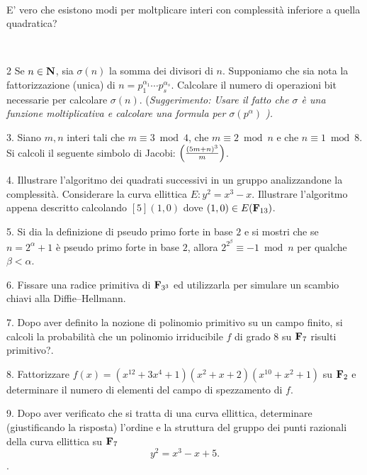 \ \dotfill\ \bigskip\bigskip\bigskip\vfil

 E' vero che esistono modi per moltplicare interi con complessit\`a 
inferiore a quella quadratica?\medskip\bigskip\bigskip

\ \dotfill\ \bigskip\bigskip\bigskip\vfil\eject

\item{2} Se $n\in{\bf N}$, sia $\sigma(n)$ la somma dei divisori di $n$. Supponiamo che sia nota
la fattorizzazione (unica) di $n=p_1^{\alpha_1}\cdots p_s^{\alpha_s}$. Calcolare il
numero di operazioni bit necessarie per calcolare $\sigma(n)$. (\it Suggerimento: Usare il
fatto che $\sigma$ \`{e} una funzione moltiplicativa e calcolare una formula per $\sigma(p^\alpha)$ \rm).\vv

\item{3.} Siano $m,n$ interi tali che $m\equiv3\bmod4$,
che $m\equiv2\bmod n$ e che $n\equiv1\bmod8$. Si calcoli il
seguente simbolo di Jacobi: $\left({(5m+n)^3 \over m}\right)$. \vv

\item{4.}  Illustrare l'algoritmo dei quadrati successivi in un gruppo analizzandone la complessit\`{a}. Considerare
la curva ellittica $E: y^2=x^3-x.$ Illustrare l'algoritmo appena descritto calcolando $[5](1,0)$ dove $(1,0)\in E({\bf F}_{13})$. \ve\ \vs

\item{5.}  Si dia la definizione di pseudo primo forte in base $2$ e si mostri che
se $n=2^\alpha+1$ \`{e} pseudo primo forte in base $2$, allora
$2^{2^\beta}\equiv -1\bmod n$ per qualche $\beta<\alpha$.\vv

\item{6.} Fissare una radice primitiva di ${\bf F}_{3^3}$ ed
 utilizzarla per simulare un scambio chiavi alla Diffie--Hellmann.\vv

\item{7.} Dopo aver definito la nozione di polinomio primitivo su un campo finito, si calcoli la probabilit\`{a} che un polinomio
irriducibile $f$ di grado $8$ su ${\bf F}_{7}$ risulti primitivo?.\ve\ \vs

\item{8.}  Fattorizzare
$f(x)=(x^{12}+3x^{4}+1)(x^2+x+2)(x^{10}+x^2+1)$ su ${\bf
  F}_2$ e determinare il numero di elementi del campo di spezzamento di $f$.\vv

\item{9.}  Dopo aver verificato che si tratta di una curva ellittica, determinare (giustificando la risposta)
l'ordine e la struttura del gruppo dei punti razionali della curva ellittica su
${\bf F}_7$
$$y^2=x^3-x+5.$$.\ \vst\bye
